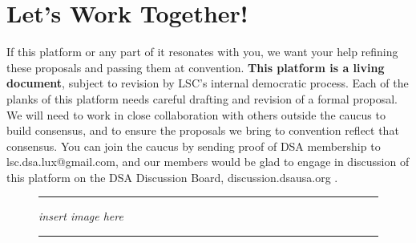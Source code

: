 \documentclass[10pt]{memoir}
\begin{document}
\pagebreak

\theendnotes

\pagebreak

\section*{Let's Work Together!}
If this platform or any part of it resonates with you, we want your help refining these proposals and passing them at convention. \textbf{This platform is a living document}, subject to revision by LSC's internal democratic process. Each of the planks of this platform needs careful drafting and revision of a formal proposal. We will need to work in close collaboration with others outside the caucus to build consensus, and to ensure the proposals we bring to convention reflect that consensus. You can join the caucus by sending proof of DSA membership to lsc.dsa.lux@gmail.com, and our members would be glad to engage in discussion of this platform on the DSA Discussion Board, discussion.dsausa.org .


\begin{figure}[h!]
\hrule
\vspace{2in}
\center\huge\emph{insert image here}
\vspace{2in}

\hrule
\end{figure}
\vfill
\pagebreak
\end{document}
